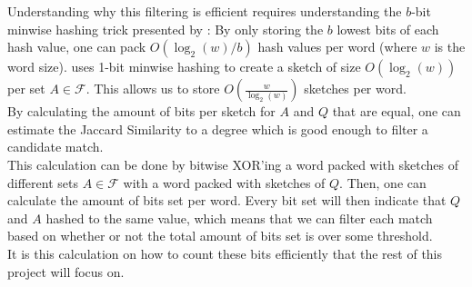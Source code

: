 Understanding why this filtering is efficient requires understanding the $b$-bit minwise hashing trick presented by \citet{li2011hashing}:
By only storing the $b$ lowest bits of each hash value, one can pack $O(\log_2(w)/b)$ hash values per word (where $w$ is the word size). \citet{fast-similarity-search} uses 1-bit minwise hashing to create a sketch of size $O(\log_2(w))$ per set $A\in \mathcal{F}$. This allows us to store $O(\frac{w}{\log_2(w)})$ sketches per word. \\
By calculating the amount of bits per sketch for $A$ and $Q$ that are equal, one can estimate the Jaccard Similarity to a degree which is good enough to filter a candidate match.\\
This calculation can be done by bitwise XOR'ing a word packed with sketches of different sets $A\in \mathcal{F}$ with a word packed with sketches of $Q$. Then, one can calculate the amount of bits set per word. Every bit set will then indicate that $Q$ and $A$ hashed to the same value, which means that we can filter each match based on whether or not the total amount of bits set is over some threshold.\\
It is this calculation on how to count these bits efficiently that the rest of this project will focus on.
